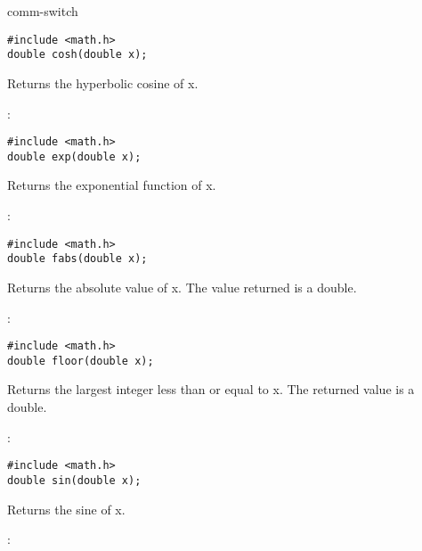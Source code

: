\begin{Ventry2}{comm-switch  }
\begin{production}
\begin{verbatim}
#include <math.h>
double cosh(double x);
\end{verbatim}
\end{production}


Returns the hyperbolic cosine of x.

\item[exp]
\label{item:exp}
:

\begin{production}
\begin{verbatim}
#include <math.h>
double exp(double x);
\end{verbatim}
\end{production}


Returns the exponential function of x.

\item[fabs]
\label{item:fabs}
:

\begin{production}
\begin{verbatim}
#include <math.h>
double fabs(double x);
\end{verbatim}
\end{production}


Returns the absolute value of x. The value returned is a
double.

\item[floor]
\label{item:floor}
:

\begin{production}
\begin{verbatim}
#include <math.h>
double floor(double x);
\end{verbatim}
\end{production}


Returns the largest integer less than or equal to x. The
returned value is a double.

\item[sin]
\label{item:sin}
:

\begin{production}
\begin{verbatim}
#include <math.h>
double sin(double x);
\end{verbatim}
\end{production}


Returns the sine of x.

\item[sinh]
\label{item:sinh}
:


\end{Ventry2}
